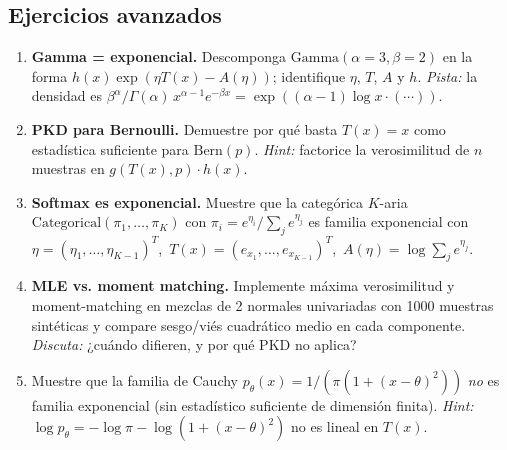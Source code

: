 \subsection*{Ejercicios avanzados}
\begin{enumerate}[resume]
	\item[$\star\star$] \textbf{Gamma = exponencial.} Descomponga $\mathrm{Gamma}(\alpha{=}3,\beta{=}2)$ en la forma $h(x)\exp(\eta T(x)-A(\eta))$; identifique $\eta$, $T$, $A$ y $h$. \textit{Pista:} la densidad es $\beta^\alpha/\Gamma(\alpha)\,x^{\alpha-1}e^{-\beta x}=\exp((\alpha{-}1)\log x\cdot (\cdots))$.
	\item[$\star\star\star$] \textbf{PKD para Bernoulli.} Demuestre por qué basta $T(x)=x$ como estadística suficiente para $\mathrm{Bern}(p)$. \textit{Hint:} factorice la verosimilitud de $n$ muestras en $g(T(x),p)\cdot h(x)$.
	\item[$\star\star\star$] \textbf{Softmax es exponencial.} Muestre que la categórica $K$-aria $\mathrm{Categorical}(\pi_1,\dots,\pi_K)$ con $\pi_i=e^{\eta_i}/\sum_j e^{\eta_j}$ es familia exponencial con \\
$\eta=(\eta_1,\dots,\eta_{K-1})^T$,\ $T(x)=(e_{x_1},\dots,e_{x_{K-1}})^T$,\ $A(\eta)=\log\sum_j e^{\eta_j}$.
	\item[$\star\star\star\star$] \textbf{MLE vs. moment matching.} Implemente máxima verosimilitud y moment-matching en mezclas de 2 normales univariadas con 1000 muestras sintéticas y compare sesgo/viés cuadrático medio en cada componente. \textit{Discuta:} ¿cuándo difieren, y por qué PKD no aplica?
	\item[$\star\star\star$] Muestre que la familia de Cauchy $p_\theta(x)=1/(\pi(1+(x-\theta)^2))$ \emph{no} es familia exponencial (sin estadístico suficiente de dimensión finita). \textit{Hint:} $\log p_\theta=-\log\pi-\log(1+(x-\theta)^2)$ no es lineal en $T(x)$.
\end{enumerate}

